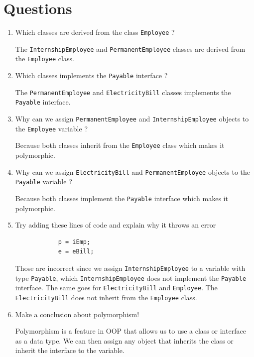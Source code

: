 \documentclass[12pt,titlepage]{article}
\begin{document}
\section{Questions}
\begin{enumerate}
    \item {
        Which classes are derived from the class \texttt{Employee} ?

        The \texttt{InternshipEmployee} and \texttt{PermanentEmployee} classes are derived from the \texttt{Employee} class.
    }
    \item {
        Which classes implements the \texttt{Payable} interface ?

        The \texttt{PermanentEmployee} and \texttt{ElectricityBill} classes implements the \texttt{Payable} interface.
    }
    \item {
        Why can we assign \texttt{PermanentEmployee} and \texttt{InternshipEmployee} objects to the \texttt{Employee} variable ?

        Because both classes inherit from the \texttt{Employee} class which makes it polymorphic.
    }
    \item {
        Why can we assign \texttt{ElectricityBill} and \texttt{PermanentEmployee} objects to the \texttt{Payable} variable ?

        Because both classes implement the \texttt{Payable} interface which makes it polymorphic.
    }
    \item {
        Try adding these lines of code and explain why it throws an error

        \begin{verbatim}
            p = iEmp;
            e = eBill;
        \end{verbatim}

        Those are incorrect since we assign \texttt{InternshipEmployee} to a variable with type \texttt{Payable}, which \texttt{InternshipEmployee} does not implement the \texttt{Payable} interface.
        The same goes for \texttt{ElectricityBill} and \texttt{Employee}. The \texttt{ElectricityBill} does not inherit from the \texttt{Employee} class.
    }
    \item {
        Make a conclusion about polymorphism!

        Polymorphism is a feature in OOP that allows us to use a class or interface as a data type. We can then assign any
        object that inherits the class or inherit the interface to the variable.
    }
\end{enumerate}
\end{document}
